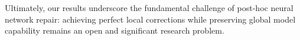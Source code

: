 \documentclass{article}
\begin{document}
Ultimately, our results underscore the fundamental challenge of post-hoc neural network repair: achieving perfect local corrections while preserving global model capability remains an open and significant research problem.





\end{document}
